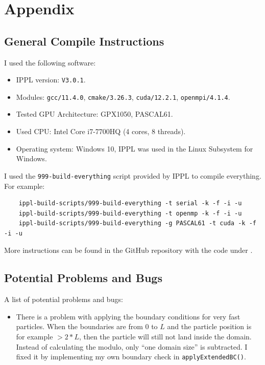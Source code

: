
\section{Appendix}

\subsection{General Compile Instructions}

I used the following software:
\begin{itemize}
    \item IPPL version: \texttt{V3.0.1}.
    \item Modules: \texttt{gcc/11.4.0}, \texttt{cmake/3.26.3}, \texttt{cuda/12.2.1}, \texttt{openmpi/4.1.4}.
    \item Tested GPU Architecture: GPX1050, PASCAL61.
    \item Used CPU: Intel Core i7-7700HQ (4 cores, 8 threads).
    \item Operating system: Windows 10, IPPL was used in the Linux Subsystem for Windows.
\end{itemize}
I used the \texttt{999-build-everything} script provided by IPPL to compile everything. For example:
\begin{verbatim}
    ippl-build-scripts/999-build-everything -t serial -k -f -i -u 
    ippl-build-scripts/999-build-everything -t openmp -k -f -i -u 
    ippl-build-scripts/999-build-everything -g PASCAL61 -t cuda -k -f -i -u 
\end{verbatim}
More instructions can be found in the GitHub repository with the code under \cite{aliemen2024}.



\subsection{Potential Problems and Bugs}

A list of potential problems and bugs:
\begin{itemize}
    \item There is a problem with applying the boundary conditions for very fast particles. When the boundaries are from $0$ to $L$ and the particle position is for example $>2*L$, then the particle will still not land inside the domain. Instead of calculating the modulo, only ``one domain size'' is subtracted. I fixed it by implementing my own boundary check in \texttt{applyExtendedBC()}.
\end{itemize}


